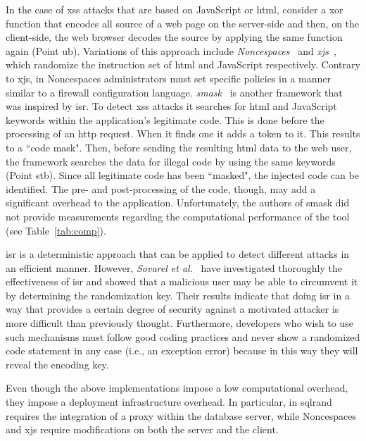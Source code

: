 \documentclass[conference]{IEEEtran}
\begin{document}
In the case of {\sc xss} attacks that are based on JavaScript or {\sc
  html}, consider a {\sc xor} function that encodes all source of a
web page on the server-side and then, on the client-side, the web
browser decodes the source by applying the same function again (Point
{\sc ub}). Variations of this approach include {\it
  Noncespaces}~\cite{GC09} and {\it x{\sc js}}~\cite{APKLM10}, which
randomize the instruction set of {\sc html} and JavaScript
respectively. Contrary to x{\sc js}, in Noncespaces administrators
must set specific policies in a manner similar to a firewall
configuration language. {\it {\sc sm}ask}~\cite{JB07} is another
framework that was inspired by {\sc isr}. To detect {\sc xss}
attacks it searches for {\sc html} and
JavaScript keywords within the application's legitimate code. This is
done before the processing of an {\sc http} request. When it finds one
it adds a token to it. This results to a ``code mask". Then, before
sending the resulting {\sc html} data to the web user, the framework
searches the data for illegal code by using the same keywords (Point
{\sc s}t{\sc b}). Since all legitimate code has been ``masked", the injected
code can be identified. The pre- and post-processing of the code,
though, may add a significant overhead to the application.
Unfortunately, the authors of {\sc sm}ask did not provide measurements
regarding the computational performance of the tool (see
Table~\ref{tab:comp}).

{\sc isr} is a deterministic approach that can be applied to detect
different attacks in an efficient manner. However, {\it Sovarel et
al.}~\cite{SEP05} have investigated thoroughly the effectiveness of
{\sc isr} and showed that a malicious user may be able to circumvent
it by determining the randomization key. Their results indicate
that doing {\sc isr} in a way that provides a certain degree of
security against a motivated attacker is more difficult than
previously thought. Furthermore, developers who wish to use such
mechanisms must follow good coding practices and never show a
randomized code statement in any case (i.e., an exception error)
because in this way they will reveal the encoding key.

Even though the above implementations impose a low computational
overhead, they impose a deployment infrastructure overhead. In particular, in
{\sc sql}rand requires the integration of a proxy within the database
server, while Noncespaces and x{\sc js} require modifications on both
the server and the client.
\end{document}
